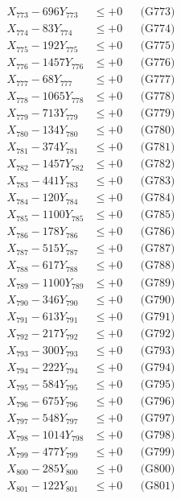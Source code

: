 \documentclass[a4paper,10pt]{article}
\begin{document}
{\begin{align}
X_{773} - 696Y_{773} &\leq +0 && \text{(G773)} \\
X_{774} - 83Y_{774} &\leq +0 && \text{(G774)} \\
X_{775} - 192Y_{775} &\leq +0 && \text{(G775)} \\
X_{776} - 1457Y_{776} &\leq +0 && \text{(G776)} \\
X_{777} - 68Y_{777} &\leq +0 && \text{(G777)} \\
X_{778} - 1065Y_{778} &\leq +0 && \text{(G778)} \\
X_{779} - 713Y_{779} &\leq +0 && \text{(G779)} \\
X_{780} - 134Y_{780} &\leq +0 && \text{(G780)} \\
\allowbreak
X_{781} - 374Y_{781} &\leq +0 && \text{(G781)} \\
X_{782} - 1457Y_{782} &\leq +0 && \text{(G782)} \\
X_{783} - 441Y_{783} &\leq +0 && \text{(G783)} \\
X_{784} - 120Y_{784} &\leq +0 && \text{(G784)} \\
X_{785} - 1100Y_{785} &\leq +0 && \text{(G785)} \\
X_{786} - 178Y_{786} &\leq +0 && \text{(G786)} \\
X_{787} - 515Y_{787} &\leq +0 && \text{(G787)} \\
X_{788} - 617Y_{788} &\leq +0 && \text{(G788)} \\
X_{789} - 1100Y_{789} &\leq +0 && \text{(G789)} \\
X_{790} - 346Y_{790} &\leq +0 && \text{(G790)} \\
\allowbreak
X_{791} - 613Y_{791} &\leq +0 && \text{(G791)} \\
X_{792} - 217Y_{792} &\leq +0 && \text{(G792)} \\
X_{793} - 300Y_{793} &\leq +0 && \text{(G793)} \\
X_{794} - 222Y_{794} &\leq +0 && \text{(G794)} \\
X_{795} - 584Y_{795} &\leq +0 && \text{(G795)} \\
X_{796} - 675Y_{796} &\leq +0 && \text{(G796)} \\
X_{797} - 548Y_{797} &\leq +0 && \text{(G797)} \\
X_{798} - 1014Y_{798} &\leq +0 && \text{(G798)} \\
X_{799} - 477Y_{799} &\leq +0 && \text{(G799)} \\
X_{800} - 285Y_{800} &\leq +0 && \text{(G800)} \\
\allowbreak
X_{801} - 122Y_{801} &\leq +0 && \text{(G801)} \\

\end{align}}
\end{document}
